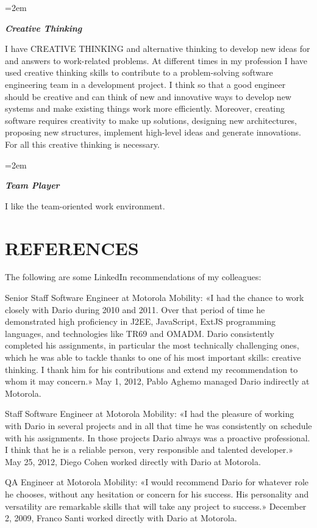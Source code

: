 \documentclass[paper=a4,fontsize=11pt]{scrartcl} %
\newlength{\spacebox}
\newcommand{\sepspace}{\vspace*{1em}}		%
\newcommand{\NewPart}[1]{\section*{\uppercase{#1}}}
\newcommand{\PersonalEntry}[2]{
		\noindent\hangindent=2em\hangafter=0 %
		\parbox{\spacebox}{        %
		\textit{#1}}		       %
		\hspace{1.5em} #2 \par}    %
\newcommand{\SkillsEntry}[2]{      %
		\noindent\hangindent=2em\hangafter=0 %
		\parbox{\spacebox}{        %
		\textit{#1}}			   %
		\hspace{1.5em} #2 \par}    %
\begin{document}
\sepspace

\SkillsEntry{\large{\textbf{Creative Thinking}}}{
I have CREATIVE THINKING and alternative thinking to develop new ideas for and answers to work-related problems. At different times in my profession I have used creative thinking skills to contribute to a problem-solving software engineering team in a development project. I think so that a good engineer should be creative and can think of new and innovative ways to develop new systems and make existing things work more efficiently. Moreover, creating software requires creativity to make up solutions, designing new architectures, proposing new structures, implement high-level ideas and generate innovations. For all this creative thinking is necessary.
}

\sepspace

\SkillsEntry{\large{\textbf{Team Player}}}{
I like the team-oriented work environment.
}


\NewPart{References}{}

The following are some LinkedIn recommendations of my colleagues:

\sepspace

Senior Staff Software Engineer at Motorola Mobility:
«I had the chance to work closely with Dario during 2010 and 2011. Over that period of time he demonstrated high proficiency in J2EE, JavaScript, ExtJS programming languages, and technologies like TR69 and OMADM. Dario consistently completed his assignments, in particular the most technically challenging ones, which he was able to tackle thanks to one of his most important skills: creative thinking. I thank him for his contributions and extend my recommendation to whom it may concern.» 
May 1, 2012, Pablo Aghemo managed Dario indirectly at Motorola.

\sepspace

Staff Software Engineer at Motorola Mobility:
«I had the pleasure of working with Dario in several projects and in all that time he was consistently on schedule with his assignments. In those projects Dario always was a proactive professional. I think that he is a reliable person, very responsible and talented developer.»  
May 25, 2012, Diego Cohen worked directly with Dario at Motorola.

\sepspace

QA Engineer at Motorola Mobility:
«I would recommend Dario for whatever role he chooses, without any hesitation or concern for his success. His personality and versatility are remarkable skills that will take any project to success.»  
December 2, 2009, Franco Santi  worked directly with Dario at Motorola.
\end{document}
